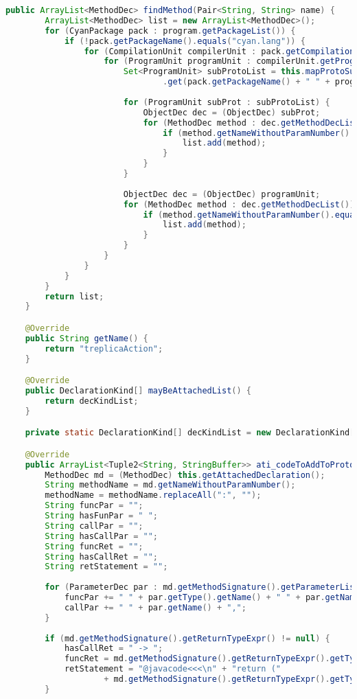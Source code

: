 \begin{lstlisting}[basicstyle=\tiny, language=Java, caption={Código Fonte de \textbf{CyanMetaobjectTreplicaAction}}, label={cod:MetaActionFonte}]
	public ArrayList<MethodDec> findMethod(Pair<String, String> name) {
		ArrayList<MethodDec> list = new ArrayList<MethodDec>();
		for (CyanPackage pack : program.getPackageList()) {
			if (!pack.getPackageName().equals("cyan.lang")) {
				for (CompilationUnit compilerUnit : pack.getCompilationUnitList()) {
					for (ProgramUnit programUnit : compilerUnit.getProgramUnitList()) {
						Set<ProgramUnit> subProtoList = this.mapProtoSubProto
								.get(pack.getPackageName() + " " + programUnit.getName());
						
                        for (ProgramUnit subProt : subProtoList) {
							ObjectDec dec = (ObjectDec) subProt;
							for (MethodDec method : dec.getMethodDecList()) {
								if (method.getNameWithoutParamNumber().equals(name.getValue())) {
									list.add(method);
								}
							}
						}
                        
						ObjectDec dec = (ObjectDec) programUnit;
						for (MethodDec method : dec.getMethodDecList()) {
							if (method.getNameWithoutParamNumber().equals(name.getValue())) {
								list.add(method);
							}
						}
					}
				}
			}
		}
		return list;
	}

	@Override
	public String getName() {
		return "treplicaAction";
	}

	@Override
	public DeclarationKind[] mayBeAttachedList() {
		return decKindList;
	}

	private static DeclarationKind[] decKindList = new DeclarationKind[] { DeclarationKind.METHOD_DEC };

	@Override
	public ArrayList<Tuple2<String, StringBuffer>> ati_codeToAddToPrototypes(ICompiler_ati compiler) {
		MethodDec md = (MethodDec) this.getAttachedDeclaration();
		String methodName = md.getNameWithoutParamNumber();
		methodName = methodName.replaceAll(":", "");
		String funcPar = "";
		String hasFunPar = " ";
		String callPar = "";
		String hasCallPar = "";
		String funcRet = "";
		String hasCallRet = "";
		String retStatement = "";
		
        for (ParameterDec par : md.getMethodSignature().getParameterList()) {
			funcPar += " " + par.getType().getName() + " " + par.getName() + ",";
			callPar += " " + par.getName() + ",";
		}
        
		if (md.getMethodSignature().getReturnTypeExpr() != null) {
			hasCallRet = " -> ";
			funcRet = md.getMethodSignature().getReturnTypeExpr().getType().getName();
			retStatement = "@javacode<<<\n" + "return ("
					+ md.getMethodSignature().getReturnTypeExpr().getType().getJavaName() + ")_ret;\n" + ">>>\n";
		}
        

\end{lstlisting}
